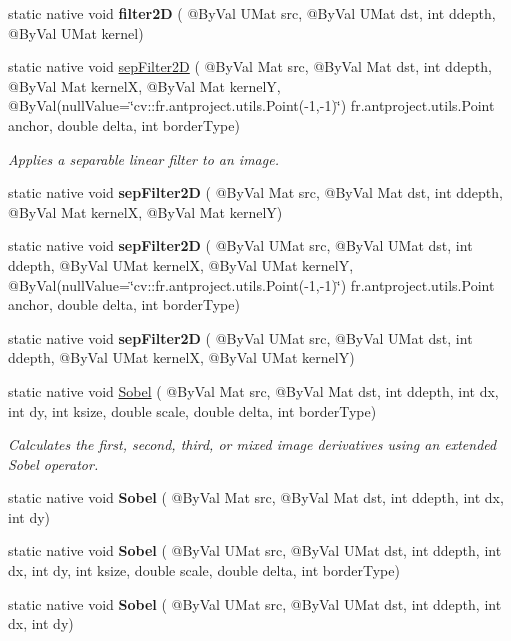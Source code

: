 \begin{DoxyCompactItemize}
\item 
static native void {\bfseries filter2D} ( @By\+Val U\+Mat src, @By\+Val U\+Mat dst, int ddepth, @By\+Val U\+Mat kernel)
\item 
static native void \hyperlink{group__imgproc__filter_ga716654f3d25206913e265bf388fd83d0}{sep\+Filter2D} ( @By\+Val Mat src, @By\+Val Mat dst, int ddepth, @By\+Val Mat kernelX, @By\+Val Mat kernelY, @By\+Val(null\+Value=\char`\"{}cv\+::\+fr.antproject.utils.Point(-\/1,-\/1)\char`\"{}) fr.antproject.utils.Point anchor, double delta, int border\+Type)
\begin{DoxyCompactList}\small\item\em Applies a separable linear filter to an image. \end{DoxyCompactList}\item 
static native void {\bfseries sep\+Filter2D} ( @By\+Val Mat src, @By\+Val Mat dst, int ddepth, @By\+Val Mat kernelX, @By\+Val Mat kernelY)
\item 
static native void {\bfseries sep\+Filter2D} ( @By\+Val U\+Mat src, @By\+Val U\+Mat dst, int ddepth, @By\+Val U\+Mat kernelX, @By\+Val U\+Mat kernelY, @By\+Val(null\+Value=\char`\"{}cv\+::\+fr.antproject.utils.Point(-\/1,-\/1)\char`\"{}) fr.antproject.utils.Point anchor, double delta, int border\+Type)
\item 
static native void {\bfseries sep\+Filter2D} ( @By\+Val U\+Mat src, @By\+Val U\+Mat dst, int ddepth, @By\+Val U\+Mat kernelX, @By\+Val U\+Mat kernelY)
\item 
static native void \hyperlink{group__imgproc__filter_ga99eaf057a0aad8f1ba5bc04ca0defe15}{Sobel} ( @By\+Val Mat src, @By\+Val Mat dst, int ddepth, int dx, int dy, int ksize, double scale, double delta, int border\+Type)
\begin{DoxyCompactList}\small\item\em Calculates the first, second, third, or mixed image derivatives using an extended Sobel operator. \end{DoxyCompactList}\item 
static native void {\bfseries Sobel} ( @By\+Val Mat src, @By\+Val Mat dst, int ddepth, int dx, int dy)
\item 
static native void {\bfseries Sobel} ( @By\+Val U\+Mat src, @By\+Val U\+Mat dst, int ddepth, int dx, int dy, int ksize, double scale, double delta, int border\+Type)
\item 
static native void {\bfseries Sobel} ( @By\+Val U\+Mat src, @By\+Val U\+Mat dst, int ddepth, int dx, int dy)
\item 

\end{DoxyCompactItemize}
